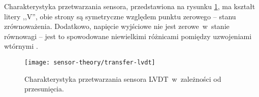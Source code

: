 Charakterystyka przetwarzania sensora, przedstawiona na rysunku \ref{img:transfer-lvdt}, ma kształt
litery ,,V'', obie strony są symetryczne względem punktu zerowego -- stanu zrównoważenia. Dodatkowo,
napięcie wyjściowe nie jest zerowe~w~stanie równowagi -- jest to spowodowane niewielkimi różnicami
pomiędzy uzwojeniami wtórnymi \cite{sensory_wykład}.

\begin{figure}[!htbp]
  \centering
  \texttt{[image: sensor-theory/transfer-lvdt]}
  \caption{\label{img:transfer-lvdt}Charakterystyka przetwarzania sensora LVDT~w~zależności od
    przesunięcia.}
\end{figure}